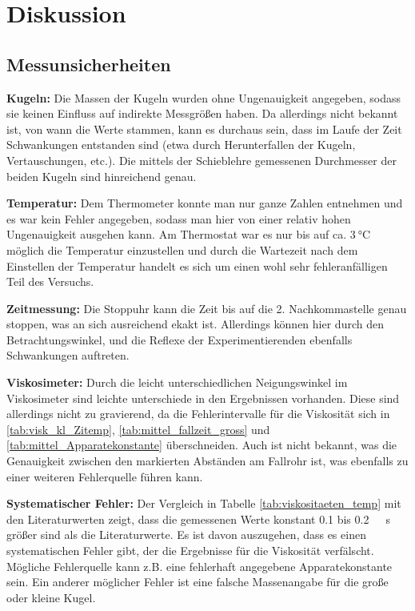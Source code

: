 \section{Diskussion}

\subsection[]{Messunsicherheiten}
\textbf{Kugeln:}
Die Massen der Kugeln wurden ohne Ungenauigkeit angegeben, sodass sie keinen Einfluss auf indirekte Messgrößen haben.
Da allerdings nicht bekannt ist, von wann die Werte stammen, kann es durchaus sein, dass im Laufe der Zeit Schwankungen entstanden sind
(etwa durch Herunterfallen der Kugeln, Vertauschungen, etc.).
Die mittels der Schieblehre gemessenen Durchmesser der beiden Kugeln sind hinreichend genau.

\textbf{Temperatur:}
Dem Thermometer konnte man nur ganze Zahlen entnehmen und es war kein Fehler angegeben, sodass man hier von einer relativ hohen Ungenauigkeit ausgehen kann.
Am Thermostat war es nur bis auf ca. $\qty{3}{\degreeCelsius}$ möglich die Temperatur einzustellen und durch die Wartezeit nach dem Einstellen der Temperatur
handelt es sich um einen wohl sehr fehleranfälligen Teil des Versuchs.

\textbf{Zeitmessung:}
Die Stoppuhr kann die Zeit bis auf die 2. Nachkommastelle genau stoppen, was an sich ausreichend ekakt ist.
Allerdings können hier durch den Betrachtungswinkel, und die Reflexe der Experimentierenden ebenfalls Schwankungen auftreten.

\textbf{Viskosimeter:}
Durch die leicht unterschiedlichen Neigungswinkel im Viskosimeter sind leichte unterschiede in den Ergebnissen vorhanden.
Diese sind allerdings nicht zu gravierend, da die Fehlerintervalle für die Viskosität sich in
 \ref{tab:visk_kl_Zitemp}, \ref{tab:mittel_fallzeit_gross} und \ref{tab:mittel_Apparatekonstante} überschneiden.
Auch ist nicht bekannt, was die Genauigkeit zwischen den markierten Abständen am Fallrohr ist, was ebenfalls zu einer weiteren Fehlerquelle führen kann.

\textbf{Systematischer Fehler:} 
Der Vergleich in Tabelle \ref{tab:viskositaeten_temp} mit den Literaturwerten zeigt, 
dass die gemessenen Werte konstant \num{0.1} bis \qty{0.2}{\milli\Pascal\s} größer sind als die Literaturwerte. 
Es ist davon auszugehen, dass es einen systematischen Fehler gibt, der die Ergebnisse für die
Viskosität verfälscht.
Mögliche Fehlerquelle kann z.B. eine fehlerhaft angegebene Apparatekonstante sein.
Ein anderer möglicher Fehler ist eine falsche Massenangabe für die große oder kleine Kugel.

